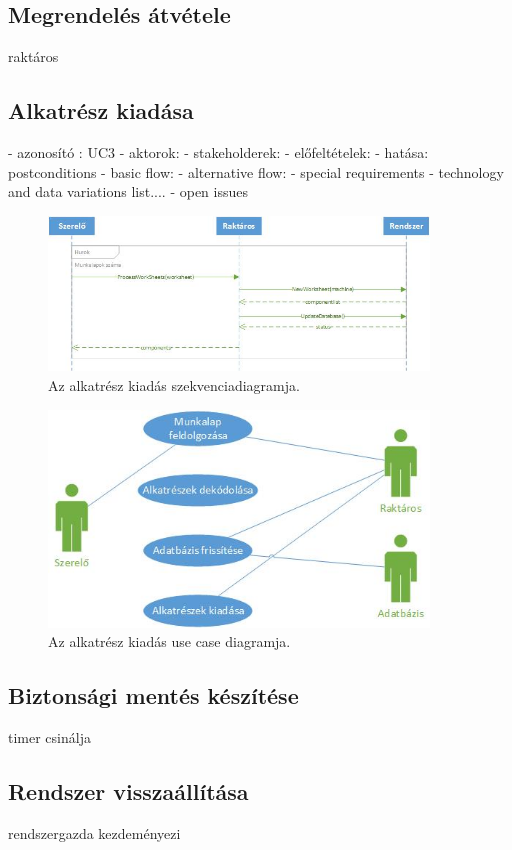 \documentclass[11pt]{article}\usepackage[left=20mm,right=20mm,top=15mm,bottom=20mm]{geometry}
\begin{document}
\subsection{Megrendelés átvétele}
raktáros

\subsection{Alkatrész kiadása}
- azonosító : UC3
- aktorok: 
- stakeholderek:
- előfeltételek:
- hatása: postconditions
- basic flow:
- alternative flow:
- special requirements
- technology and data variations list.... 
- open issues

\begin{figure}[!h]
    \centering
        \includegraphics[width=0.9\textwidth]{figures/alkatresz_kiadas_SD.jpg}
        \caption{Az alkatrész kiadás szekvenciadiagramja.}
\end{figure}

\begin{figure}[!h]
    \centering
        \includegraphics[width=0.9\textwidth]{figures/alkatresz_kiadas_UC.jpg}
        \caption{Az alkatrész kiadás use case diagramja.}
\end{figure}

\subsection{Biztonsági mentés készítése}
timer csinálja

\subsection{Rendszer visszaállítása}
rendszergazda kezdeményezi





\FloatBarrier
\end{document}
